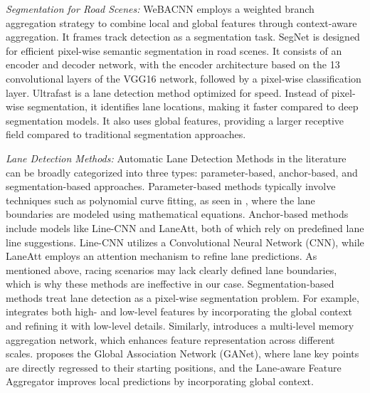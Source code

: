 
\textit{Segmentation for Road Scenes:} WeBACNN\cite{ghosh2024weighted} employs a weighted branch aggregation strategy to combine local and global features through context-aware aggregation. It frames track detection as a segmentation task. SegNet\cite{segnet} is designed for efficient pixel-wise semantic segmentation in road scenes. It consists of an encoder and decoder network, with the encoder architecture based on the 13 convolutional layers of the VGG16 network\cite{vgg16}, followed by a pixel-wise classification layer. Ultrafast\cite{ultrafast} is a lane detection method optimized for speed. Instead of pixel-wise segmentation, it identifies lane locations, making it faster compared to deep segmentation models. It also uses global features, providing a larger receptive field compared to traditional segmentation approaches.

\textit{Lane Detection Methods:} Automatic Lane Detection Methods in the literature can be broadly categorized into three types: parameter-based, anchor-based, and segmentation-based approaches. Parameter-based methods typically involve techniques such as polynomial curve fitting, as seen in \cite{Feng_2022_CVPR, poly}, where the lane boundaries are modeled using mathematical equations. Anchor-based methods include models like Line-CNN\cite{linecnn} and LaneAtt\cite{laneatt}, both of which rely on predefined lane line suggestions. Line-CNN utilizes a Convolutional Neural Network (CNN), while LaneAtt employs an attention mechanism to refine lane predictions. As mentioned above, racing scenarios may lack clearly defined lane boundaries, which is why these methods are ineffective in our case. Segmentation-based methods treat lane detection as a pixel-wise segmentation problem. For example, \cite{Zheng_2022_CVPR} integrates both high- and low-level features by incorporating the global context and refining it with low-level details. Similarly, \cite{vil100} introduces a multi-level memory aggregation network, which enhances feature representation across different scales. \cite{Wang_2022_CVPR} proposes the Global Association Network (GANet), where lane key points are directly regressed to their starting positions, and the Lane-aware Feature Aggregator improves local predictions by incorporating global context. 

